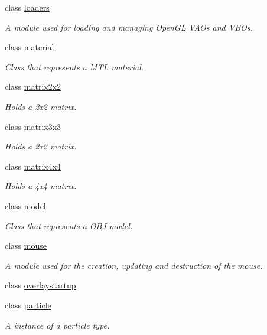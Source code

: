 \begin{DoxyCompactItemize}
class \hyperlink{classflounder_1_1loaders}{loaders}
\begin{DoxyCompactList}\small\item\em A module used for loading and managing Open\+GL V\+AO\textquotesingle{}s and V\+BO\textquotesingle{}s. \end{DoxyCompactList}\item 
class \hyperlink{classflounder_1_1material}{material}
\begin{DoxyCompactList}\small\item\em Class that represents a M\+TL material. \end{DoxyCompactList}\item 
class \hyperlink{classflounder_1_1matrix2x2}{matrix2x2}
\begin{DoxyCompactList}\small\item\em Holds a 2x2 matrix. \end{DoxyCompactList}\item 
class \hyperlink{classflounder_1_1matrix3x3}{matrix3x3}
\begin{DoxyCompactList}\small\item\em Holds a 2x2 matrix. \end{DoxyCompactList}\item 
class \hyperlink{classflounder_1_1matrix4x4}{matrix4x4}
\begin{DoxyCompactList}\small\item\em Holds a 4x4 matrix. \end{DoxyCompactList}\item 
class \hyperlink{classflounder_1_1model}{model}
\begin{DoxyCompactList}\small\item\em Class that represents a O\+BJ model. \end{DoxyCompactList}\item 
class \hyperlink{classflounder_1_1mouse}{mouse}
\begin{DoxyCompactList}\small\item\em A module used for the creation, updating and destruction of the mouse. \end{DoxyCompactList}\item 
class \hyperlink{classflounder_1_1overlaystartup}{overlaystartup}
\item 
class \hyperlink{classflounder_1_1particle}{particle}
\begin{DoxyCompactList}\small\item\em A instance of a particle type. \end{DoxyCompactList}\item 

\end{DoxyCompactItemize}
